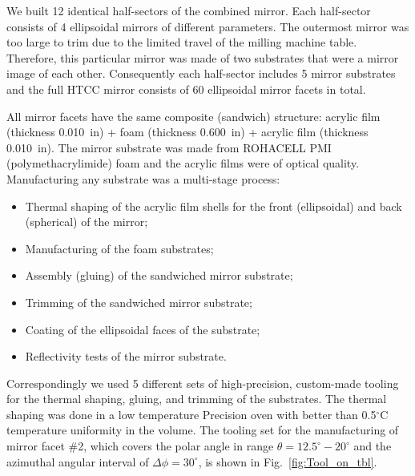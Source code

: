 We built 12 identical half-sectors of the combined mirror. Each half-sector consists of 4 ellipsoidal mirrors of
different parameters. The outermost mirror was too large to trim due to the limited travel of the milling machine
table. Therefore, this particular mirror was made of two substrates that were a mirror image of each other.
Consequently each half-sector includes 5 mirror substrates and the full HTCC mirror consists of 60 ellipsoidal
mirror facets in total. 

All mirror facets have the same composite (sandwich) structure: acrylic film (thickness 0.010~in) + foam (thickness
0.600~in) + acrylic film (thickness 0.010~in). The mirror substrate was made from ROHACELL PMI
(polymethacrylimide) foam and the acrylic films were of optical quality. Manufacturing any substrate was a
multi-stage process:
\begin{itemize}
    \item Thermal shaping of the acrylic film shells for the front (ellipsoidal) and back (spherical) of the mirror;
    \item Manufacturing of the foam substrates;
    \item Assembly (gluing) of the sandwiched mirror substrate;
    \item Trimming of the sandwiched mirror substrate;
    \item Coating of the ellipsoidal faces of the substrate;
    \item Reflectivity tests of the mirror substrate.
    \end{itemize}

Correspondingly we used 5 different sets of high-precision, custom-made tooling for the thermal shaping, gluing,
and trimming of the substrates. The thermal shaping was done in a low temperature Precision oven with better than
0.5$^\circ$C  temperature uniformity in the volume. The tooling set for the manufacturing of mirror facet \#2,
which covers the polar angle in range $\theta = 12.5^\circ - 20^\circ$ and the azimuthal angular interval of
$\Delta \phi = 30^\circ$, is shown in Fig.~\ref{fig:Tool_on_tbl}.

